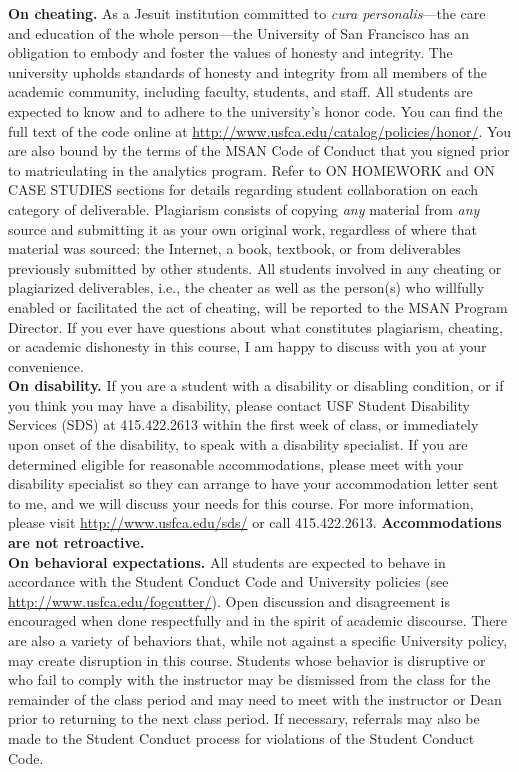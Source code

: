 \documentclass[11pt]{article}
\begin{document}
\noindent \textbf{On cheating.} As a Jesuit institution committed to \emph{cura personalis}---the care and education of the whole person---the University of San Francisco has an obligation to embody and foster the values of honesty and integrity. The university upholds standards of honesty and integrity from all members of the academic community, including faculty, students, and staff. All students are expected to know and to adhere to the university's honor code. You can find the full text of the code online at \url{http://www.usfca.edu/catalog/policies/honor/}. You are also bound by the terms of the MSAN Code of Conduct that you signed prior to matriculating in the analytics program. Refer to ON HOMEWORK and ON CASE STUDIES sections for details regarding student collaboration on each category of deliverable. Plagiarism consists of copying \emph{any} material from \emph{any} source and submitting it as your own original work, regardless of where that material was sourced: the Internet, a book, textbook, or from deliverables previously submitted by other students. All students involved in any cheating or plagiarized deliverables, i.e., the cheater as well as the person(s) who willfully enabled or facilitated the act of cheating, will be reported to the MSAN Program Director. If you ever have questions about what constitutes plagiarism, cheating, or academic dishonesty in this course, I am happy to discuss with you at your convenience.\\

\noindent \textbf{On disability.} If you are a student with a disability or disabling condition, or if you think you may have a disability, please contact USF Student Disability Services (SDS) at 415.422.2613 within the first week of class, or immediately upon onset of the disability, to speak with a disability specialist. If you are determined eligible for reasonable accommodations, please meet with your disability specialist so they can arrange to have your accommodation letter sent to me, and we will discuss your needs for this course. For more information, please visit \url{http://www.usfca.edu/sds/} or call 415.422.2613. {\bf Accommodations are not retroactive.}\\

\noindent \textbf{On behavioral expectations.} All students are expected to behave in accordance with the Student Conduct Code and University policies (see \url{http://www.usfca.edu/fogcutter/}).  Open discussion and disagreement is encouraged when done respectfully and in the spirit of academic discourse. There are also a variety of behaviors that, while not against a specific University policy, may create disruption in this course. Students whose behavior is disruptive or who fail to comply with the instructor may be dismissed from the class for the remainder of the class period and may need to meet with the instructor or Dean prior to returning to the next class period. If necessary, referrals may also be made to the Student Conduct process for violations of the Student Conduct Code. \\
\end{document}
